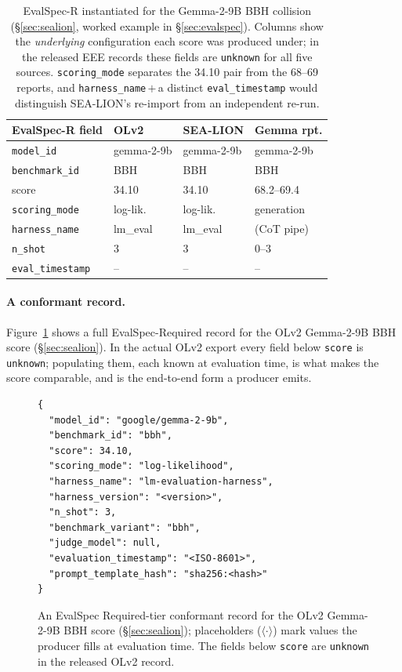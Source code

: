 \documentclass[11pt]{article}
\begin{document}
\begin{table}[ht]
\centering
\small
\setlength{\tabcolsep}{4pt}
\begin{tabular}{llll}
\toprule
EvalSpec-R field & OLv2 & SEA-LION & Gemma rpt. \\
\midrule
\texttt{model\_id}      & gemma-2-9b & gemma-2-9b & gemma-2-9b \\
\texttt{benchmark\_id}  & BBH        & BBH        & BBH \\
score                   & 34.10      & 34.10      & 68.2--69.4 \\
\texttt{scoring\_mode}  & log-lik.   & log-lik.   & generation \\
\texttt{harness\_name}  & lm\_eval  & lm\_eval  & (CoT pipe) \\
\texttt{n\_shot}        & 3          & 3          & 0--3 \\
\texttt{eval\_timestamp}& --        & --        & -- \\
\bottomrule
\end{tabular}
\caption{EvalSpec-R instantiated for the Gemma-2-9B BBH collision
(\S\ref{sec:sealion}, worked example in \S\ref{sec:evalspec}). Columns show the
\emph{underlying} configuration each score was produced under; in the released
EEE records these fields are \texttt{unknown} for all five sources.
\texttt{scoring\_mode} separates the 34.10 pair from the 68--69 reports, and
\texttt{harness\_name}\,$+$\,a distinct \texttt{eval\_timestamp} would
distinguish SEA-LION's re-import from an independent re-run.}
\label{tab:evalspec-worked}
\end{table}

\paragraph{A conformant record.} Figure~\ref{fig:evalspec-json} shows a full
EvalSpec-Required record for the OLv2 Gemma-2-9B BBH score (\S\ref{sec:sealion}).
In the actual OLv2 export every field below \texttt{score} is \texttt{unknown};
populating them, each known at evaluation time, is what makes the score
comparable, and is the end-to-end form a producer emits.

\begin{figure}[ht]
\small
\begin{verbatim}
{
  "model_id": "google/gemma-2-9b",
  "benchmark_id": "bbh",
  "score": 34.10,
  "scoring_mode": "log-likelihood",
  "harness_name": "lm-evaluation-harness",
  "harness_version": "<version>",
  "n_shot": 3,
  "benchmark_variant": "bbh",
  "judge_model": null,
  "evaluation_timestamp": "<ISO-8601>",
  "prompt_template_hash": "sha256:<hash>"
}
\end{verbatim}
\caption{An EvalSpec Required-tier conformant record for the OLv2 Gemma-2-9B
BBH score (\S\ref{sec:sealion}); placeholders ($\langle\cdot\rangle$) mark
values the producer fills at evaluation time. The fields below \texttt{score}
are \texttt{unknown} in the released OLv2 record.}
\label{fig:evalspec-json}
\end{figure}
\end{document}
